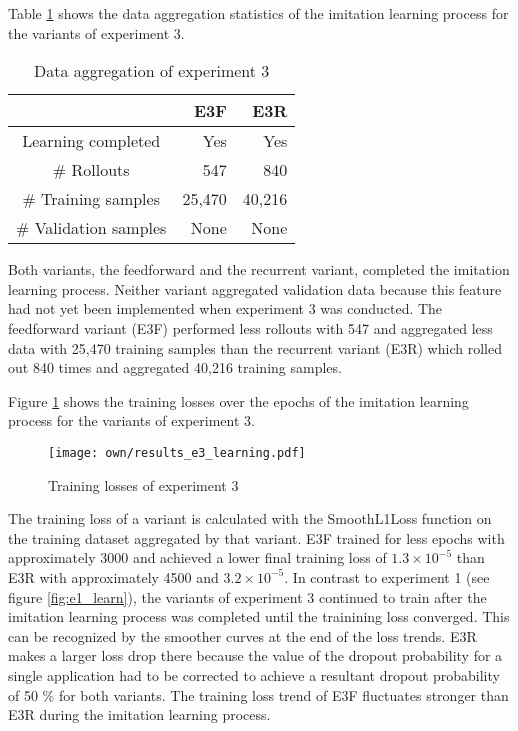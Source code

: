 Table \ref{tab:e3_data} shows
the data aggregation statistics of the imitation learning process for the variants of experiment 3.
\begin{table}[h]
    \caption[
        Data aggregation of experiment 3
    ]{
        Data aggregation of experiment 3
        \label{tab:e3_data}}        
    \centering
    \begin{tabular}{|c|r|r|} 
        \cline{2-3}
        \multicolumn{1}{c|}{}
        &E3F
        &E3R
        \\\hline
        Learning completed
        &Yes
        &Yes
        \\\hline
        \# Rollouts
        &547
        &840
        \\\hline
        \# Training samples
        &25,470
        &40,216
        \\\hline
        \# Validation samples
        &None
        &None
        \\\hline
    \end{tabular}
\end{table}
Both variants, the feedforward and the recurrent variant, completed the imitation learning process.
Neither variant aggregated validation data 
because this feature had not yet been implemented when experiment 3 was conducted.
The feedforward variant (E3F) performed less rollouts with 547
and aggregated less data with 25,470 training samples
than the recurrent variant (E3R) which rolled out 840 times
and aggregated 40,216 training samples.

Figure \ref{fig:e3_learn} shows the 
training losses over the epochs of the imitation learning process for the variants of experiment 3.
\begin{figure}
    \centering
    \texttt{[image: own/results\_e3\_learning.pdf]}
    \caption[
        Training losses of experiment 3
    ]{
        Training losses of experiment 3
    \label{fig:e3_learn}}
\end{figure}
The training loss of a variant is calculated with the SmoothL1Loss function
on the training dataset aggregated by that variant.
E3F trained for less epochs with approximately 3000
and achieved a lower final training loss of $1.3\times 10^{-5}$
than E3R with approximately 4500 and $3.2\times 10^{-5}$.
In contrast to experiment 1 (see figure \ref{fig:e1_learn}),
the variants of experiment 3
continued to train
after the imitation learning process was completed 
until the trainining loss converged.
This can be recognized by the smoother curves at the end of the loss trends.
E3R makes a larger loss drop there
because the value of the dropout probability for a single application
had to be corrected to achieve a resultant dropout probability of 50 \% for both variants.
The training loss trend of E3F fluctuates stronger than E3R
during the imitation learning process.


